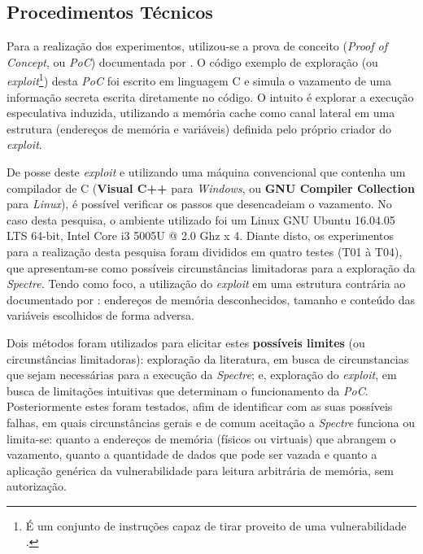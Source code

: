 \documentclass[
	article,			    %
	12pt,				    %
	oneside,			    %
	a4paper,			    %
	chapter=TITLE,		    %
	section=TITLE,		    %
	subsection=TITLE,	    %
	english,			    %
	brazil,				    %
	sumario=tradicional
]{abntex2}
\begin{document}
\subsection{Procedimentos Técnicos}
Para a realização dos experimentos, utilizou-se a prova de conceito (\emph{Proof of Concept}, ou \emph{PoC}) documentada por . O código exemplo de exploração (ou \emph{exploit}\footnote{É um conjunto de instruções \cite{Cruz2016Estudo} capaz de tirar proveito de uma vulnerabilidade \cite{Cambridge2019Exploit}.}) desta \emph{PoC} foi escrito em linguagem C e simula o vazamento de uma informação secreta escrita diretamente no código. O intuito é explorar a execução especulativa induzida, utilizando a memória cache como canal lateral em uma estrutura (endereços de memória e variáveis) definida pelo próprio criador do \emph{exploit}. 

De posse deste \emph{exploit} e utilizando uma máquina convencional que contenha um compilador de C (\textbf{Visual C++} para \emph{Windows}, ou \textbf{GNU Compiler Collection} para \emph{Linux}), é possível verificar os passos que desencadeiam o vazamento. No caso desta pesquisa, o ambiente utilizado foi um Linux GNU Ubuntu 16.04.05 LTS 64-bit, Intel\textsuperscript{\tiny\textregistered} Core\textsuperscript{\tiny\texttrademark} i3 5005U @ 2.0 Ghz x 4. Diante disto, os experimentos para a realização desta pesquisa foram divididos em quatro testes (T01 à T04), que apresentam-se como possíveis circunstâncias limitadoras para a exploração da \emph{Spectre}. Tendo como foco, a utilização do \emph{exploit} em uma estrutura contrária ao documentado por : endereços de memória desconhecidos, tamanho e conteúdo das variáveis escolhidos de forma adversa.

Dois métodos foram utilizados para elicitar estes \textbf{possíveis limites} (ou circunstâncias limitadoras): exploração da literatura, em busca de circunstancias que sejam necessárias para a execução da \emph{Spectre}; e, exploração do \emph{exploit}, em busca de limitações intuitivas que determinam o funcionamento da \emph{PoC}. Posteriormente estes foram testados, afim de identificar com as suas possíveis falhas, em quais circunstâncias gerais e de comum aceitação a \emph{Spectre} funciona ou limita-se: quanto a endereços de memória (físicos ou virtuais) que abrangem o vazamento, quanto a quantidade de dados que pode ser vazada e quanto a aplicação genérica da vulnerabilidade para leitura arbitrária de memória, sem autorização.
\end{document}
